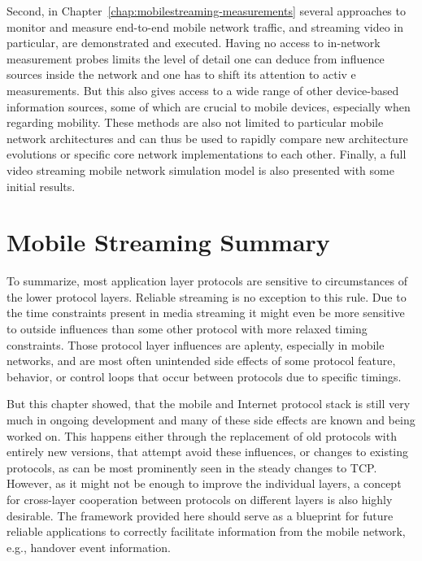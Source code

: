 Second, in Chapter~\ref{chap:mobilestreaming-measurements} several approaches to monitor and measure end-to-end mobile network traffic, and streaming video in particular, are demonstrated and executed. Having no access to in-network measurement probes limits the level of detail one can deduce from influence sources inside the network and one has to shift its attention to activ e measurements. But this also gives access to a wide range of other device-based information sources, some of which are crucial to mobile devices, especially when regarding mobility. These methods are also not limited to particular mobile network architectures and can thus be used to rapidly compare new architecture evolutions or specific core network implementations to each other. Finally, a full video streaming mobile network simulation model is also presented with some initial results.








\section{Mobile Streaming Summary}

To summarize, most application layer protocols are sensitive to circumstances of the lower protocol layers. Reliable streaming is no exception to this rule. Due to the time constraints present in media streaming it might even be more sensitive to outside influences than some other protocol with more relaxed timing constraints. Those protocol layer influences are aplenty, especially in mobile networks, and are most often unintended side effects of some protocol feature, behavior, or control loops that occur between protocols due to specific timings.

But this chapter showed, that the mobile and Internet protocol stack is still very much in ongoing development and many of these side effects are known and being worked on. This happens either through the replacement of old protocols with entirely new versions, that attempt avoid these influences, or changes to existing protocols, as can be most prominently seen in the steady changes to \gls{TCP}. However, as it might not be enough to improve the individual layers, a concept for cross-layer cooperation between protocols on different layers is also highly desirable. The framework provided here should serve as a blueprint for future reliable applications to correctly facilitate information from the mobile network, e.g., handover event information.


